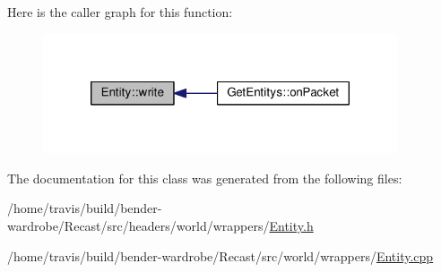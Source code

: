 Here is the caller graph for this function\-:
\nopagebreak
\begin{figure}[H]
\begin{center}
\leavevmode
\includegraphics[width=296pt]{class_entity_a0f53605a8fe550f6811d953b32c8f94c_icgraph}
\end{center}
\end{figure}




The documentation for this class was generated from the following files\-:\begin{DoxyCompactItemize}
\item 
/home/travis/build/bender-\/wardrobe/\-Recast/src/headers/world/wrappers/\hyperlink{_entity_8h}{Entity.\-h}\item 
/home/travis/build/bender-\/wardrobe/\-Recast/src/world/wrappers/\hyperlink{_entity_8cpp}{Entity.\-cpp}\end{DoxyCompactItemize}

